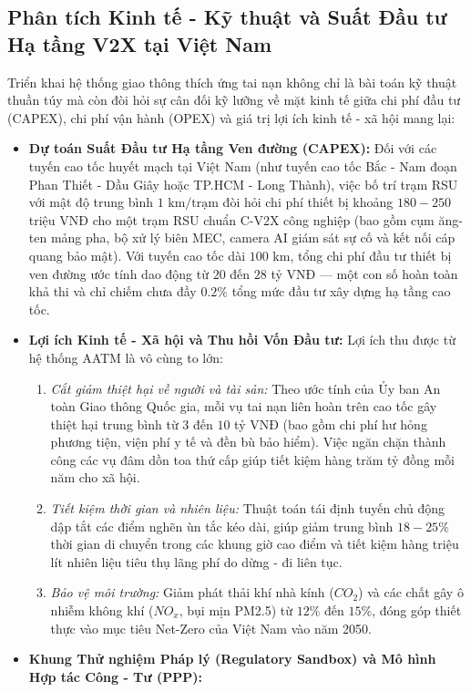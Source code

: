\documentclass[a4paper]{article}
\begin{document}
\subsection{Phân tích Kinh tế - Kỹ thuật và Suất Đầu tư Hạ tầng V2X tại Việt Nam}
Triển khai hệ thống giao thông thích ứng tai nạn không chỉ là bài toán kỹ thuật thuần túy mà còn đòi hỏi sự cân đối kỹ lưỡng về mặt kinh tế giữa chi phí đầu tư (CAPEX), chi phí vận hành (OPEX) và giá trị lợi ích kinh tế - xã hội mang lại:
\begin{itemize}
    \item \textbf{Dự toán Suất Đầu tư Hạ tầng Ven đường (CAPEX):}
    Đối với các tuyến cao tốc huyết mạch tại Việt Nam (như tuyến cao tốc Bắc - Nam đoạn Phan Thiết - Dầu Giây hoặc TP.HCM - Long Thành), việc bố trí trạm RSU với mật độ trung bình $1\text{ km/trạm}$ đòi hỏi chi phí thiết bị khoảng $180 - 250$ triệu VNĐ cho một trạm RSU chuẩn C-V2X công nghiệp (bao gồm cụm ăng-ten mảng pha, bộ xử lý biên MEC, camera AI giám sát sự cố và kết nối cáp quang bảo mật). Với tuyến cao tốc dài $100\text{ km}$, tổng chi phí đầu tư thiết bị ven đường ước tính dao động từ $20$ đến $28$ tỷ VNĐ — một con số hoàn toàn khả thi và chỉ chiếm chưa đầy $0.2\%$ tổng mức đầu tư xây dựng hạ tầng cao tốc.
    \item \textbf{Lợi ích Kinh tế - Xã hội và Thu hồi Vốn Đầu tư:}
    Lợi ích thu được từ hệ thống AATM là vô cùng to lớn:
    \begin{enumerate}
        \item \textit{Cắt giảm thiệt hại về người và tài sản:} Theo ước tính của Ủy ban An toàn Giao thông Quốc gia, mỗi vụ tai nạn liên hoàn trên cao tốc gây thiệt hại trung bình từ $3$ đến $10$ tỷ VNĐ (bao gồm chi phí hư hỏng phương tiện, viện phí y tế và đền bù bảo hiểm). Việc ngăn chặn thành công các vụ đâm dồn toa thứ cấp giúp tiết kiệm hàng trăm tỷ đồng mỗi năm cho xã hội.
        \item \textit{Tiết kiệm thời gian và nhiên liệu:} Thuật toán tái định tuyến chủ động dập tắt các điểm nghẽn ùn tắc kéo dài, giúp giảm trung bình $18 - 25\%$ thời gian di chuyển trong các khung giờ cao điểm và tiết kiệm hàng triệu lít nhiên liệu tiêu thụ lãng phí do dừng - đi liên tục.
        \item \textit{Bảo vệ môi trường:} Giảm phát thải khí nhà kính ($CO_2$) và các chất gây ô nhiễm không khí ($NO_x$, bụi mịn PM2.5) từ $12\%$ đến $15\%$, đóng góp thiết thực vào mục tiêu Net-Zero của Việt Nam vào năm 2050.
    \end{enumerate}
    \item \textbf{Khung Thử nghiệm Pháp lý (Regulatory Sandbox) và Mô hình Hợp tác Công - Tư (PPP):}

\end{itemize}
\end{document}

